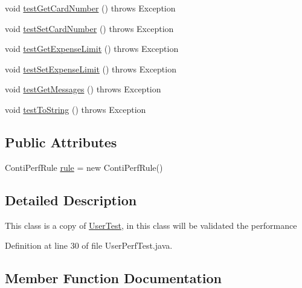 \begin{DoxyCompactItemize}
\item 
void \hyperlink{classes_1_1deusto_1_1server_1_1jdo_1_1_user_perf_test_ad41dab134b1d2b5108d1be73aea650f1}{test\+Get\+Card\+Number} ()  throws Exception 
\item 
void \hyperlink{classes_1_1deusto_1_1server_1_1jdo_1_1_user_perf_test_a876ee3155a7522f155fd97e8850f1e85}{test\+Set\+Card\+Number} ()  throws Exception 
\item 
void \hyperlink{classes_1_1deusto_1_1server_1_1jdo_1_1_user_perf_test_a4b29567e33f758eb813deda8a28f79cf}{test\+Get\+Expense\+Limit} ()  throws Exception 
\item 
void \hyperlink{classes_1_1deusto_1_1server_1_1jdo_1_1_user_perf_test_a471f44e6ae8fe57f87d1cf8253037ccb}{test\+Set\+Expense\+Limit} ()  throws Exception 
\item 
void \hyperlink{classes_1_1deusto_1_1server_1_1jdo_1_1_user_perf_test_a422743db799f0da050647e2fe59574f7}{test\+Get\+Messages} ()  throws Exception 
\item 
void \hyperlink{classes_1_1deusto_1_1server_1_1jdo_1_1_user_perf_test_a6744a929575c948f3a725bc07ea17dd6}{test\+To\+String} ()  throws Exception 
\end{DoxyCompactItemize}
\subsection*{Public Attributes}
\begin{DoxyCompactItemize}
\item 
Conti\+Perf\+Rule \hyperlink{classes_1_1deusto_1_1server_1_1jdo_1_1_user_perf_test_af2b161e23a713f11bdff3f0c2a2b7801}{rule} = new Conti\+Perf\+Rule()
\end{DoxyCompactItemize}


\subsection{Detailed Description}
This class is a copy of \hyperlink{classes_1_1deusto_1_1server_1_1jdo_1_1_user_test}{User\+Test}, in this class will be validated the performance 

Definition at line 30 of file User\+Perf\+Test.\+java.



\subsection{Member Function Documentation}
\mbox{\label{classes_1_1deusto_1_1server_1_1jdo_1_1_user_perf_test_a9f45a1081d058c5d1b0ca81d4cb42389}} 
